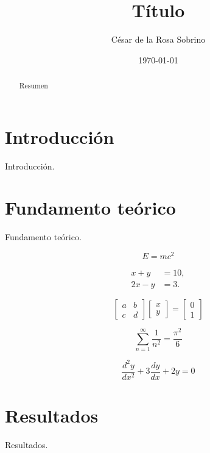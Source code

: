 \documentclass[twocolumn, aps, prd, 10pt, nofootinbib]{revtex4-2}
\date{\today}
\makeatletter
\renewcommand{\date}[1]{\gdef\@date{\textnormal{Fecha: #1}}}
\makeatother
\begin{document}
\title{Título}
\author{César de la Rosa Sobrino}
\date{\today}

\begin{abstract}
	Resumen
\end{abstract}

\maketitle

\section{Introducción}
Introducción.
\section{Fundamento teórico}
Fundamento teórico.

\begin{equation}
  E = mc^2
\end{equation}

\begin{align}
  x + y &= 10, \\
  2x - y &= 3.
\end{align}

\begin{equation}
  \begin{bmatrix}
    a & b \\
    c & d
  \end{bmatrix}
  \begin{bmatrix}
    x \\ y
  \end{bmatrix}
  =
  \begin{bmatrix}
    0 \\ 1
  \end{bmatrix}
\end{equation}

\begin{equation}
  \sum_{n=1}^{\infty} \frac{1}{n^2} = \frac{\pi^2}{6}
\end{equation}

\begin{equation}
  \frac{d^2y}{dx^2} + 3 \frac{dy}{dx} + 2y = 0
\end{equation}

\section{Resultados}
Resultados.
\end{document}
